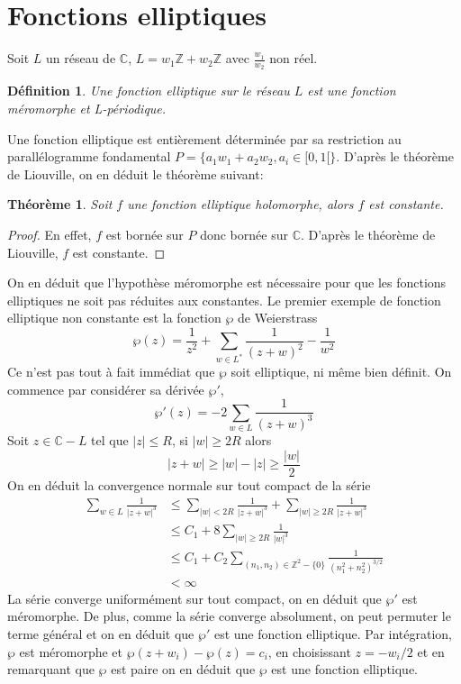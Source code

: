 \documentclass{article}
\newtheorem{definition}{Définition}
\newtheorem{theoreme}{Théorème}
\begin{document}
\section{Fonctions elliptiques}
Soit $L$ un réseau de $\mathbb{C}$, $L=w_{1}\mathbb{Z}+w_{2}\mathbb{Z}$ avec $\frac{w_{1}}{w_{2}}$ non réel.
\begin{definition}
Une fonction elliptique sur le réseau $L$ est une fonction méromorphe et L-périodique.
\end{definition}

Une fonction elliptique est entièrement déterminée par sa restriction au parallélogramme fondamental
$P=\{a_{1}w_{1}+a_{2}w_{2}, a_{i}\in [0, 1[\}$. D'après le théorème de Liouville, on en déduit le
théorème suivant:
\begin{theoreme}
Soit $f$ une fonction elliptique holomorphe, alors $f$ est constante.
\end{theoreme}

\begin{proof}
En effet, $f$ est bornée sur $P$ donc bornée sur $\mathbb{C}$.
D'après le théorème de Liouville, $f$ est constante.
\end{proof}

On en déduit que l'hypothèse méromorphe est nécessaire pour que les fonctions elliptiques ne soit
pas réduites aux constantes. Le premier exemple de fonction elliptique non constante est
la fonction $\wp$ de Weierstrass
\begin{equation*}
\wp(z)=\frac{1}{z^2} + \sum_{w\in L^{*}}{\frac{1}{(z+w)^2}-\frac{1}{w^2}}
\end{equation*}
Ce n'est pas tout à fait immédiat que $\wp$ soit elliptique, ni même bien définit. On commence par
considérer sa dérivée $\wp'$,
\begin{equation*}
\wp'(z)=-2\sum_{w\in L}{\frac{1}{(z+w)^3}}
\end{equation*}
Soit $z\in \mathbb{C}-L$ tel que $|z| \leq R$, si $|w|\geq 2R$ alors
\begin{equation*}
|z+w| \geq |w| - |z| \geq \frac{|w|}{2}
\end{equation*}
On en déduit la convergence normale sur tout compact de la série
\begin{align*}
\sum_{w\in L}{\frac{1}{|z+w|^3}} &\leq \sum_{|w| < 2R}{\frac{1}{|z+w|^3}} + \sum_{|w|\geq 2R}{\frac{1}{|z+w|^3}} \\
								&\leq C_{1} + 8\sum_{|w|\geq 2R}{\frac{1}{|w|^3}} \\
		&\leq C_{1} + C_{2}\sum_{(n_{1},n_{2})\in \mathbb{Z}^2-\{0\}}{\frac{1}{(n_{1}^2+n_{2}^2)^{3/2}}} \\
								&< \infty
\end{align*}
La série converge uniformément sur tout compact, on en déduit que $\wp'$ est méromorphe.
De plus, comme la série converge absolument, on peut permuter le terme général et on en
déduit que $\wp'$ est une fonction elliptique. Par intégration, $\wp$ est méromorphe et $\wp(z+w_{i})-\wp(z)=c_{i}$,
en choisissant $z=-w_{i}/2$ et en remarquant que $\wp$ est paire on en déduit que $\wp$ est une fonction elliptique.
\end{document}
